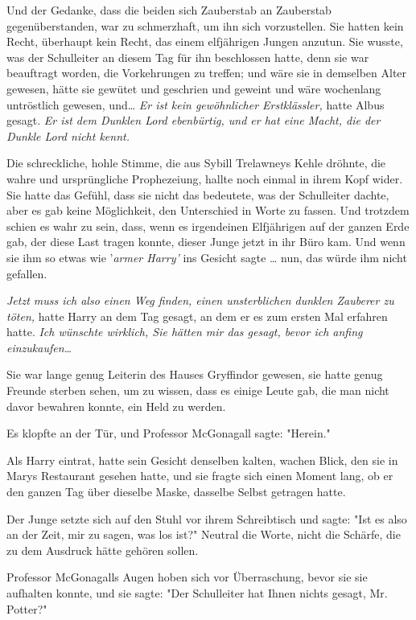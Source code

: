 {Und der Gedanke, dass die beiden sich Zauberstab an Zauberstab gegenüberstanden, war zu schmerzhaft, um ihn sich vorzustellen. Sie hatten kein Recht, überhaupt kein Recht, das einem elfjährigen Jungen anzutun. Sie wusste, was der Schulleiter an diesem Tag für ihn beschlossen hatte, denn sie war beauftragt worden, die Vorkehrungen zu treffen; und wäre sie in demselben Alter gewesen, hätte sie gewütet und geschrien und geweint und wäre wochenlang untröstlich gewesen, und… \emph{Er ist kein gewöhnlicher Erstklässler,} hatte Albus gesagt. \emph{Er ist dem Dunklen Lord ebenbürtig, und er hat eine Macht, die der Dunkle Lord nicht kennt.}

Die schreckliche, hohle Stimme, die aus Sybill Trelawneys Kehle dröhnte, die wahre und ursprüngliche Prophezeiung, hallte noch einmal in ihrem Kopf wider. Sie hatte das Gefühl, dass sie nicht das bedeutete, was der Schulleiter dachte, aber es gab keine Möglichkeit, den Unterschied in Worte zu fassen. Und trotzdem schien es wahr zu sein, dass, wenn es irgendeinen Elfjährigen auf der ganzen Erde gab, der diese Last tragen konnte, dieser Junge jetzt in ihr Büro kam. Und wenn sie ihm so etwas wie '\emph{armer Harry'} ins Gesicht sagte … nun, das würde ihm nicht gefallen.

\emph{Jetzt muss ich also einen Weg finden, einen unsterblichen dunklen Zauberer zu töten,} hatte Harry an dem Tag gesagt, an dem er es zum ersten Mal erfahren hatte. \emph{Ich wünschte wirklich, Sie hätten mir das gesagt, bevor ich anfing einzukaufen…}

Sie war lange genug Leiterin des Hauses Gryffindor gewesen, sie hatte genug Freunde sterben sehen, um zu wissen, dass es einige Leute gab, die man nicht davor bewahren konnte, ein Held zu werden.

Es klopfte an der Tür, und Professor McGonagall sagte: "Herein."

Als Harry eintrat, hatte sein Gesicht denselben kalten, wachen Blick, den sie in Marys Restaurant gesehen hatte, und sie fragte sich einen Moment lang, ob er den ganzen Tag über dieselbe Maske, dasselbe Selbst getragen hatte.

Der Junge setzte sich auf den Stuhl vor ihrem Schreibtisch und sagte: "Ist es also an der Zeit, mir zu sagen, was los ist?" Neutral die Worte, nicht die Schärfe, die zu dem Ausdruck hätte gehören sollen.

Professor McGonagalls Augen hoben sich vor Überraschung, bevor sie sie aufhalten konnte, und sie sagte: "Der Schulleiter hat Ihnen nichts gesagt, Mr. Potter?"

}
